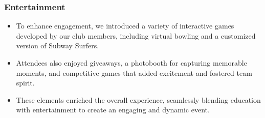 \documentclass[11pt, twocolumn]{article}
\begin{document}
\subsubsection{Entertainment}
\begin{itemize}
    \item To enhance engagement, we introduced a variety of interactive games developed by our club members, including virtual bowling and a customized version of Subway Surfers.
    \item Attendees also enjoyed giveaways, a photobooth for capturing memorable moments, and competitive games that added excitement and fostered team spirit.
    \item These elements enriched the overall experience, seamlessly blending education with entertainment to create an engaging and dynamic event.
\end{itemize}
\end{document}

